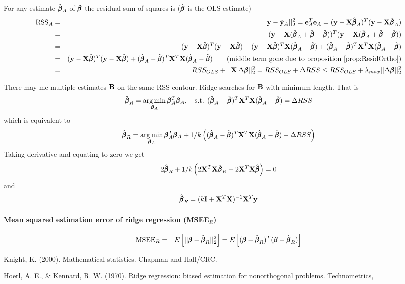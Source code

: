 For any estimate $\hat{\pmb{\beta}}_A$ of $\pmb{\beta}$ the residual sum of squares is ($\hat{\pmb{\beta}}$ is the OLS estimate)
\begin{eqnarray*}
\text{RSS}_A & = & ||\mathbf{y} - \hat{\mathbf{y}}_A||_2^2 = \mathbf{e}^T_A \mathbf{e}_A = (\mathbf{y} - \mathbf{X} \hat{\pmb{\beta}}_A)^T (\mathbf{y} - \mathbf{X} \hat{\pmb{\beta}}_A) \\
& = & (\mathbf{y} - \mathbf{X} (\hat{\pmb{\beta}}_A + \hat{\pmb{\beta}} - \hat{\pmb{\beta}}) )^T (\mathbf{y} - \mathbf{X} (\hat{\pmb{\beta}}_A + \hat{\pmb{\beta}} - \hat{\pmb{\beta}}) ) \\
& = & (\mathbf{y} - \mathbf{X} \hat{\pmb{\beta}})^T (\mathbf{y} - \mathbf{X} \hat{\pmb{\beta}}) + (\mathbf{y} - \mathbf{X} \hat{\pmb{\beta}})^T \mathbf{X} (\hat{\pmb{\beta}}_A - \hat{\pmb{\beta}}) +
(\hat{\pmb{\beta}}_A - \hat{\pmb{\beta}})^T \mathbf{X}^T \mathbf{X} (\hat{\pmb{\beta}}_A - \hat{\pmb{\beta}}) \nonumber \\
& = & (\mathbf{y} - \mathbf{X} \hat{\pmb{\beta}})^T (\mathbf{y} - \mathbf{X} \hat{\pmb{\beta}}) +
(\hat{\pmb{\beta}}_A - \hat{\pmb{\beta}})^T \mathbf{X}^T \mathbf{X} (\hat{\pmb{\beta}}_A - \hat{\pmb{\beta}}) \qquad \text{(middle term gone due to proposition \eqref{prop:ResidOrtho})} \nonumber \\
& = & RSS_{OLS} + || \mathbf{X} \, \Delta \pmb{\beta} ||_2^2  = RSS_{OLS} + \Delta RSS
\leq RSS_{OLS} + \lambda_{max} || \Delta \pmb{\beta} ||_2^2
\end{eqnarray*}

There may me multiple estimates $\mathbf{B}$ on the same RSS contour. Ridge searches for $\mathbf{B}$ with minimum length. That is 
\begin{equation*}
\hat{\pmb{\beta}}_R = \operatorname*{arg\,min}_{\pmb{\beta}_A} \pmb{\beta}_A^T \pmb{\beta}_A, \quad \text{s.t. } (\hat{\pmb{\beta}}_A - \hat{\pmb{\beta}})^T \mathbf{X}^T \mathbf{X} (\hat{\pmb{\beta}}_A - \hat{\pmb{\beta}}) = \Delta RSS
\end{equation*}
which is equivalent to 
\begin{equation*}
\hat{\pmb{\beta}}_R = \operatorname*{arg\,min}_{\pmb{\beta}_A} \pmb{\beta}_A^T \pmb{\beta}_A + 1/k  \left( (\hat{\pmb{\beta}}_A - \hat{\pmb{\beta}})^T \mathbf{X}^T \mathbf{X} (\hat{\pmb{\beta}}_A - \hat{\pmb{\beta}}) - \Delta RSS \right)
\end{equation*}
Taking derivative and equating to zero we get
\begin{equation*}
2 \hat{\pmb{\beta}}_R + 1/k \left( 2 \mathbf{X}^T \mathbf{X} \hat{\pmb{\beta}}_R - 2 \mathbf{X}^T \mathbf{X} \hat{\pmb{\beta}} \right) = 0
\end{equation*}
and 
\begin{equation}
\hat{\pmb{\beta}}_R = (k \mathbf{I} + \mathbf{X}^T \mathbf{X})^{-1} \mathbf{X}^T \mathbf{y}
\end{equation}


\paragraph{Mean squared estimation error of ridge regression  (MSEE$_R$)}
\begin{eqnarray}\label{eq:MSEE}
\text{MSEE}_R & = & E \left[ ||\pmb{\beta} - \hat{\pmb{\beta}}_R||_2^2 \right]
 = E \left[ (\pmb{\beta} - \hat{\pmb{\beta}}_R)^T (\pmb{\beta} - \hat{\pmb{\beta}}_R) \right] \nonumber \\
 \end{eqnarray}

\begin{thebibliography}{9}

Knight, K. (2000). Mathematical statistics. Chapman and Hall/CRC.

Hoerl, A. E., \& Kennard, R. W. (1970). Ridge regression: biased estimation for nonorthogonal problems. Technometrics, 

\end{thebibliography}






